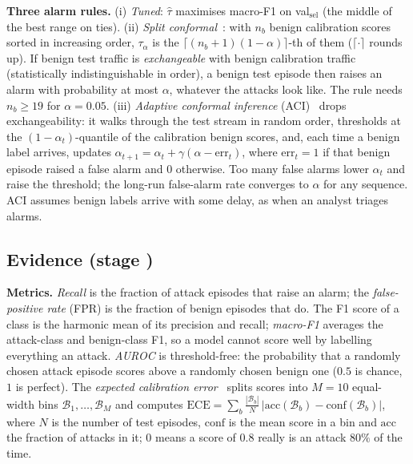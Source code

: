 \documentclass[conference,compsoc]{IEEEtran}
\begin{document}
\textbf{Three alarm rules.} (i) \emph{Tuned}: $\hat\tau$ maximises macro-F1 on val$_{\text{sel}}$ (the middle of the best range on ties). (ii) \emph{Split conformal}~\cite{Vovk2005ALRW}: with $n_{b}$ benign calibration scores sorted in increasing order, $\tau_{\alpha}$ is the $\lceil(n_{b}+1)(1-\alpha)\rceil$-th of them ($\lceil\cdot\rceil$ rounds up). If benign test traffic is \emph{exchangeable} with benign calibration traffic (statistically indistinguishable in order), a benign test episode then raises an alarm with probability at most $\alpha$, whatever the attacks look like. The rule needs $n_{b}\ge19$ for $\alpha=0.05$. (iii) \emph{Adaptive conformal inference} (ACI)~\cite{Gibbs2021ACI} drops exchangeability: it walks through the test stream in random order, thresholds at the $(1-\alpha_{t})$-quantile of the calibration benign scores, and, each time a benign label arrives, updates $\alpha_{t+1}=\alpha_{t}+\gamma(\alpha-\mathrm{err}_{t})$, where $\mathrm{err}_{t}=1$ if that benign episode raised a false alarm and $0$ otherwise. Too many false alarms lower $\alpha_{t}$ and raise the threshold; the long-run false-alarm rate converges to $\alpha$ for any sequence. ACI assumes benign labels arrive with some delay, as when an analyst triages alarms.

\subsection{Evidence (stage )}
\label{sec:metrics}
\textbf{Metrics.} \emph{Recall} is the fraction of attack episodes that raise an alarm; the \emph{false-positive rate} (FPR) is the fraction of benign episodes that do. The F1 score of a class is the harmonic mean of its precision and recall; \emph{macro-F1} averages the attack-class and benign-class F1, so a model cannot score well by labelling everything an attack. \emph{AUROC} is threshold-free: the probability that a randomly chosen attack episode scores above a randomly chosen benign one ($0.5$ is chance, $1$ is perfect). The \emph{expected calibration error}~\cite{Guo2017Calibration} splits scores into $M=10$ equal-width bins $\mathcal{B}_{1},\dots,\mathcal{B}_{M}$ and computes $\mathrm{ECE}=\sum_{b}\tfrac{|\mathcal{B}_{b}|}{N}\,\bigl|\mathrm{acc}(\mathcal{B}_{b})-\mathrm{conf}(\mathcal{B}_{b})\bigr|$, where $N$ is the number of test episodes, $\mathrm{conf}$ is the mean score in a bin and $\mathrm{acc}$ the fraction of attacks in it; $0$ means a score of $0.8$ really is an attack $80\%$ of the time.
\end{document}
